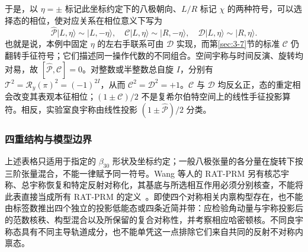 于是，以 $\eta=\pm$ 标记此坐标约定下的八极朝向、$L/R$ 标记 $\chi$ 的两种符号，可以选择态的相位，使对应关系在相位意义下写为
\[
\hat{\mathcal P}|L,\eta\rangle\sim|L,-\eta\rangle,\quad
\mathcal C|L,\eta\rangle\sim|R,-\eta\rangle,\quad
\mathcal D|L,\eta\rangle\sim|R,\eta\rangle.
\]
也就是说，本例中固定 $\eta$ 的左右手联系可由 $\mathcal D$ 实现，而第\ref{sec:3-7}节的标准 $\mathcal C$ 仍翻转手征符号；它们描述同一操作代数的不同组合。空间宇称与时间反演、旋转均对易，故 $[\hat{\mathcal P},\mathcal C]=0$。对整数或半整数总自旋 $I$，分别有 $\mathcal T^2=\mathcal R_y(\pi)^2=(-1)^{2I}$，从而 $\mathcal C^2=\mathcal D^2=+1$。$\mathcal C$ 与 $\mathcal D$ 均反幺正，态的重定相会改变其表观本征相位；$(1\pm\mathcal C)/2$ 不是复希尔伯特空间上的线性手征投影算符。相反，实验室良宇称由线性投影 $(1\pm\hat{\mathcal P})/2$ 分类。

\subsubsection{四重结构与模型边界}

上述表格只适用于指定的 $\beta_{30}$ 形状及坐标约定；一般八极张量的各分量在旋转下按三阶张量混合，不能一律赋予同一符号。Wang 等人的 RAT-PRM 另有核芯宇称、总宇称恢复和特定反射对称化，其基底与所选相互作用必须分别核查，不能将此表直接当成所有 RAT-PRM 的定义~\cite{wang-2019-rat-prm-78br-octupole-correlations}。即使四个对称相关内禀构型存在，也不能由标签数推出四个独立的投影低能态或四条近简并带：应检验角动量与宇称投影后的范数核秩、构型混合以及所保留的复合对称性，并考察相应哈密顿核。不同良宇称态具有不同主导轨道成分，也不能单凭这一点排除它们来自共同的反射不对称内禀态。
